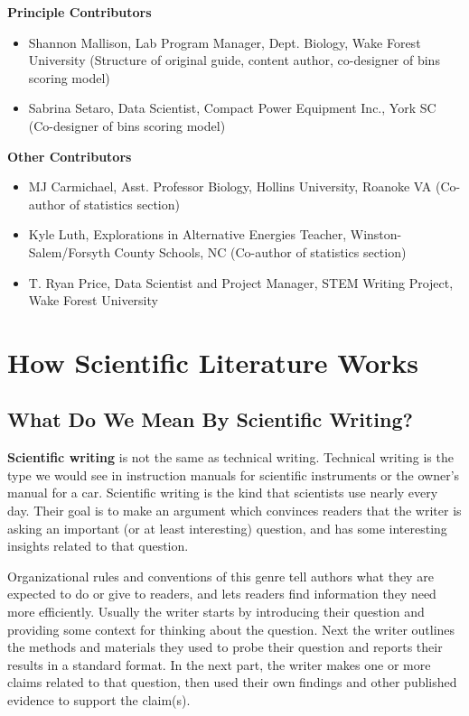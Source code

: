 \documentclass[
]{book}
\providecommand{\tightlist}{%
  \setlength{\itemsep}{0pt}\setlength{\parskip}{0pt}}
\begin{document}
\textbf{Principle Contributors}

\begin{itemize}
\tightlist
\item
  Shannon Mallison, Lab Program Manager, Dept. Biology, Wake Forest University (Structure of original guide, content author, co-designer of bins scoring model)
\item
  Sabrina Setaro, Data Scientist, Compact Power Equipment Inc., York SC (Co-designer of bins scoring model)
\end{itemize}

\textbf{Other Contributors}

\begin{itemize}
\tightlist
\item
  MJ Carmichael, Asst. Professor Biology, Hollins University, Roanoke VA (Co-author of statistics section)
\item
  Kyle Luth, Explorations in Alternative Energies Teacher, Winston-Salem/Forsyth County Schools, NC (Co-author of statistics section)
\item
  T. Ryan Price, Data Scientist and Project Manager, STEM Writing Project, Wake Forest University
\end{itemize}

\hypertarget{part-how-scientific-literature-works}{%
\part{How Scientific Literature Works}\label{part-how-scientific-literature-works}}

\hypertarget{goals100}{%
\chapter{What Do We Mean By Scientific Writing?}\label{goals100}}

\textbf{Scientific writing} is not the same as technical writing. Technical writing is the type we would see in instruction manuals for scientific instruments or the owner's manual for a car. Scientific writing is the kind that scientists use nearly every day. Their goal is to make an argument which convinces readers that the writer is asking an important (or at least interesting) question, and has some interesting insights related to that question.

Organizational rules and conventions of this genre tell authors what they are expected to do or give to readers, and lets readers find information they need more efficiently. Usually the writer starts by introducing their question and providing some context for thinking about the question. Next the writer outlines the methods and materials they used to probe their question and reports their results in a standard format. In the next part, the writer makes one or more claims related to that question, then used their own findings and other published evidence to support the claim(s).
\end{document}
